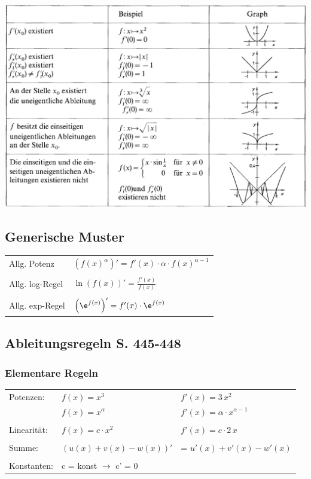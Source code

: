 			

		\includegraphics[width=0.9\linewidth]{Bilder/konvergenz-divergenz}
			
			
			\subsection{Generische Muster}
			\begin{tabular}{ll}
			Allg. Potenz &  $\left( f(x)^\alpha \right)' = f'(x) \cdot \alpha \cdot f(x) ^{\alpha - 1} $ \\
			\\
			Allg. log-Regel & $\ln \left( f(x) \right)' = \frac{f'(x)}{f(x)} $ \\
			\\
			Allg. exp-Regel & $ \left( \e^{f(x)} \right)' = f'(x) \cdot \e^{f(x)} $ \\
			\end{tabular}
			
			
			\subsection{Ableitungsregeln S. 445-448}
			
			\subsubsection{Elementare Regeln}
			\begin{tabular}{lll}
			Potenzen: & $f(x) = x^3$ & $f'(x) = 3 \, x^2$ \\
			& $f(x) = x^\alpha$ & $f'(x) = \alpha \cdot x^{\alpha - 1}$ \\
			\\
			Linearität: & $f(x) = c \cdot x^2$ & $f'(x) = c \cdot 2 \, x $ \\
			\\
			Summe: & $(u(x) + v(x) - w(x))' $ & = $u'(x) + v'(x) - w'(x)$ \\
			\\
			Konstanten: & c = konst $\rightarrow$ c' = 0 \\
			\end{tabular}
			
